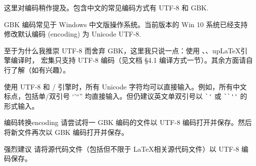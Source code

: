 这里对编码稍作提及。包含中文的常见编码方式有 UTF-8 和 GBK.

GBK 编码常见于 Windows 中文版操作系统。当前版本的 Win 10 系统已经支持修改默认编码 (encoding) 为 Unicode UTF-8.

至于为什么我推崇 UTF-8 而舍弃 GBK，这里我只说一点：使用 、、up\LaTeX 引擎编译时， \CTeX 宏集只支持 UTF-8 编码（见文档 \cite{ctex} \S 4.1 编译方式一节）。其余方面请自行了解（如有兴趣）。

使用 UTF-8 和 / 引擎时，所有 Unicode 字符均可以直接输入。例如，所有中文标点，包括单/双引号 ‘’“” 均直接输入。但仍建议英文单双引号以 \verb|`'| 或 \verb|``''| 的形式输入。

\begin{Ex}{编码转换}{encoding}
请尝试将一 GBK 编码的文件以 UTF-8 编码打开并保存。然后将新文件再次以 GBK 编码打开并保存。
\end{Ex}

\begin{notice}{强烈建议}
请将源代码文件（包括但不限于 \LaTeX 相关源代码文件）以 UTF-8 编码保存。
\end{notice}
